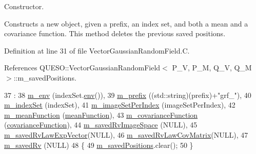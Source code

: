 Constructor. 

Constructs a new object, given a prefix, an index set, and both a mean and a covariance function. This method deletes the previous saved positions. 

Definition at line 31 of file Vector\-Gaussian\-Random\-Field.\-C.



References Q\-U\-E\-S\-O\-::\-Vector\-Gaussian\-Random\-Field$<$ P\-\_\-\-V, P\-\_\-\-M, Q\-\_\-\-V, Q\-\_\-\-M $>$\-::m\-\_\-saved\-Positions.


\begin{DoxyCode}
37   :
38   \hyperlink{class_q_u_e_s_o_1_1_vector_gaussian_random_field_ab4ad80cb336314fd0025abf0d37c5aa0}{m\_env}                (indexSet.\hyperlink{class_q_u_e_s_o_1_1_vector_set_aa0ed80853d166754ba6ed83e63e737aa}{env}()),
39   \hyperlink{class_q_u_e_s_o_1_1_vector_gaussian_random_field_a1adeb7ad40609acaa8a5e47b19026e36}{m\_prefix}             ((std::string)(prefix)+\textcolor{stringliteral}{"grf\_"}),
40   \hyperlink{class_q_u_e_s_o_1_1_vector_gaussian_random_field_a3b4453419ff7b6e593b2f6cc88830490}{m\_indexSet}           (indexSet),
41   \hyperlink{class_q_u_e_s_o_1_1_vector_gaussian_random_field_a6e1a9a6a3512559e1579e3c8a266141f}{m\_imageSetPerIndex}   (imageSetPerIndex),
42   \hyperlink{class_q_u_e_s_o_1_1_vector_gaussian_random_field_a648031ddf7e3d5d4d0eb353edc52b4bc}{m\_meanFunction}       (\hyperlink{class_q_u_e_s_o_1_1_vector_gaussian_random_field_ad14336d5026583fcc31662d1790e8cf2}{meanFunction}),
43   \hyperlink{class_q_u_e_s_o_1_1_vector_gaussian_random_field_a67b1325646a7076207d768cfd796eb95}{m\_covarianceFunction} (\hyperlink{class_q_u_e_s_o_1_1_vector_gaussian_random_field_a5c68f05266b73ad99cc52748b99febe2}{covarianceFunction}),
44   \hyperlink{class_q_u_e_s_o_1_1_vector_gaussian_random_field_a8fba910fff533442361ad7bd93e5706b}{m\_savedRvImageSpace}  (NULL),
45   \hyperlink{class_q_u_e_s_o_1_1_vector_gaussian_random_field_a544ce2c5ff0329b6fb7c625e71eb3576}{m\_savedRvLawExpVector}(NULL),
46   \hyperlink{class_q_u_e_s_o_1_1_vector_gaussian_random_field_a0a07c1eec3d56ef764b13586a36921d3}{m\_savedRvLawCovMatrix}(NULL),
47   \hyperlink{class_q_u_e_s_o_1_1_vector_gaussian_random_field_a7e2ed5d146f65c8c4ddbd1d4e496647d}{m\_savedRv}            (NULL)
48 \{
49   \hyperlink{class_q_u_e_s_o_1_1_vector_gaussian_random_field_aa51f310fb54dd4807522a0e72be61acd}{m\_savedPositions}.clear();
50 \}
\end{DoxyCode}
